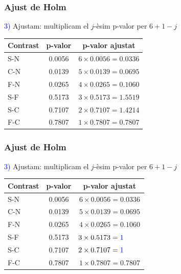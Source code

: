 \documentclass[12pt,t]{beamer}
\newcommand{\blue}[1]{\textcolor{blue}{#1}}
\theoremstyle{plain}
\theoremstyle{definition}
\begin{document}
\begin{frame}
\frametitle{Ajust de Holm}

\blue{3)} Ajustam: multiplicam el $j$-èsim p-valor per $6+1-j$

\begin{center}
\begin{tabular}{l|cc}
Contrast & p-valor & p-valor ajustat\\ \hline
S-N & 0.0056 & $6\times 0.0056=0.0336 $\\
C-N & 0.0139& $5\times 0.0139=0.0695 $\\
F-N & 0.0265& $4\times 0.0265=0.1060 $\\
S-F & 0.5173& $3\times 0.5173=1.5519 $\\
S-C & 0.7107& $2\times 0.7107=1.4214 $\\
F-C &0.7807& $1\times 0.7807=0.7807$\\
\end{tabular}
\end{center}
\end{frame}

\begin{frame}
\frametitle{Ajust de Holm}

\blue{3)} Ajustam: multiplicam el $j$-èsim p-valor per $6+1-j$

\begin{center}
\begin{tabular}{l|cc}
Contrast & p-valor & p-valor ajustat\\ \hline
S-N & 0.0056 & $6\times 0.0056=0.0336 $\\
C-N & 0.0139& $5\times 0.0139=0.0695 $\\
F-N & 0.0265& $4\times 0.0265=0.1060 $\\
S-F & 0.5173& $3\times 0.5173=\blue{1}\hphantom{.5519} $\\
S-C & 0.7107& $2\times 0.7107=\blue{1}\hphantom{.5519} $\\
F-C &0.7807& $1\times 0.7807=0.7807$\\
\end{tabular}
\end{center}
\end{frame}
\end{document}
